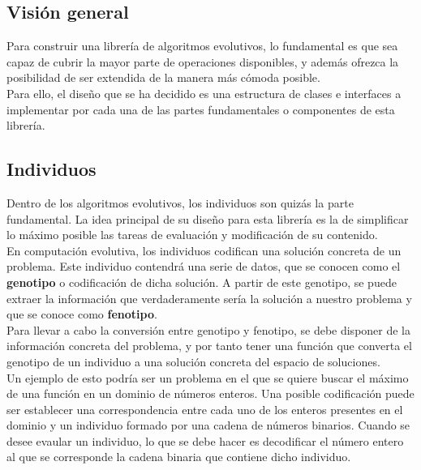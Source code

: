 \subsection{Visión general}

Para construir una librería de algoritmos evolutivos, lo fundamental es que sea capaz de cubrir la mayor parte de operaciones disponibles, y además ofrezca la posibilidad de ser extendida de la manera más cómoda posible. \\

Para ello, el diseño que se ha decidido es una estructura de clases e interfaces a implementar por cada una de las partes fundamentales o componentes de esta librería.

\subsection{Individuos}

Dentro de los algoritmos evolutivos, los individuos son quizás la parte fundamental. La idea principal de su diseño para esta librería es la de simplificar lo máximo posible las tareas de evaluación y modificación de su contenido. \\

En computación evolutiva, los individuos codifican una solución concreta de un problema. Este individuo contendrá una serie de datos, que se conocen como el \textbf{genotipo} o codificación de dicha solución. A partir de este genotipo, se puede extraer la información que verdaderamente sería la solución a nuestro problema y que se conoce como \textbf{fenotipo}. \\

Para llevar a cabo la conversión entre genotipo y fenotipo, se debe disponer de la información concreta del problema, y por tanto tener una función que converta el genotipo de un individuo a una solución concreta del espacio de soluciones. \\

Un ejemplo de esto podría ser un problema en el que se quiere buscar el máximo de una función en un dominio de números enteros. Una posible codificación puede ser establecer una correspondencia entre cada uno de los enteros presentes en el dominio y un individuo formado por una cadena de números binarios. Cuando se desee evaular un individuo, lo que se debe hacer es decodificar el número entero al que se corresponde la cadena binaria que contiene dicho individuo. \\

